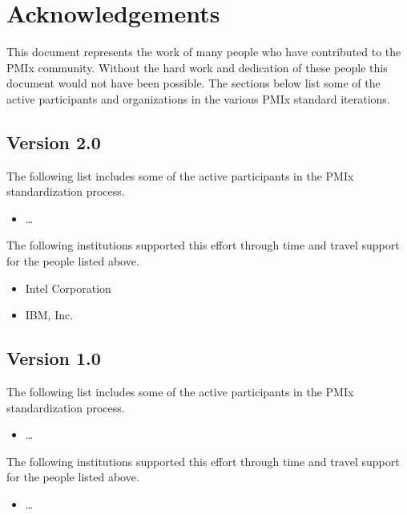 \chapter{Acknowledgements}
\label{chap:acknowledgements}

This document represents the work of many people who have contributed to the PMIx community.
Without the hard work and dedication of these people this document would not have been possible.
The sections below list some of the active participants and organizations in the various PMIx standard iterations.

\section{Version 2.0}

The following list includes some of the active participants in the PMIx standardization process.

\begin{itemize}
\item \ldots
\end{itemize}

The following institutions supported this effort through time and travel support for the people listed above.

\begin{itemize}
\item Intel Corporation
\item IBM, Inc.
\end{itemize}


\section{Version 1.0}

The following list includes some of the active participants in the PMIx standardization process.

\begin{itemize}
\item \ldots
\end{itemize}

The following institutions supported this effort through time and travel support for the people listed above.

\begin{itemize}
\item \ldots
\end{itemize}
